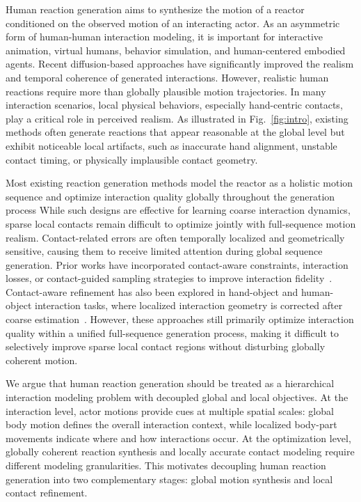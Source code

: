 \documentclass{article}
\begin{document}
Human reaction generation aims to synthesize the motion of a reactor conditioned on the observed motion of an interacting actor. As an asymmetric form of human-human interaction modeling, it is important for interactive animation, virtual humans, behavior simulation, and human-centered embodied agents. 
Recent diffusion-based approaches have significantly improved the realism and temporal coherence of generated interactions.
However, realistic human reactions require more than globally plausible motion trajectories. 
In many interaction scenarios, local physical behaviors, especially hand-centric contacts, play a critical role in perceived realism. 
As illustrated in Fig.~\ref{fig:intro}, existing methods often generate reactions that appear reasonable at the global level but exhibit noticeable local artifacts, such as inaccurate hand alignment, unstable contact timing, or physically implausible contact geometry.

Most existing reaction generation methods model the reactor as a holistic motion sequence and optimize interaction quality globally throughout the generation process
While such designs are effective for learning coarse interaction dynamics, sparse local contacts remain difficult to optimize jointly with full-sequence motion realism. Contact-related errors are often temporally localized and geometrically sensitive, causing them to receive limited attention during global sequence generation. 
Prior works have incorporated contact-aware constraints, interaction losses, or contact-guided sampling strategies to improve interaction fidelity~\cite{xu2024regennet, zhang2025reactffusion}. 
Contact-aware refinement has also been explored in hand-object and human-object interaction tasks, where localized interaction geometry is corrected after coarse estimation~\cite{zhou2022toch, diller2024cg, cha2024text2hoi}. 
However, these approaches still primarily optimize interaction quality within a unified full-sequence generation process, making it difficult to selectively improve sparse local contact regions without disturbing globally coherent motion.

We argue that human reaction generation should be treated as a hierarchical interaction modeling problem with decoupled global and local objectives. 
At the interaction level, actor motions provide cues at multiple spatial scales: global body motion defines the overall interaction context, while localized body-part movements indicate where and how interactions occur. 
At the optimization level, globally coherent reaction synthesis and locally accurate contact modeling require different modeling granularities. 
This motivates decoupling human reaction generation into two complementary stages: global motion synthesis and local contact refinement.
\end{document}
